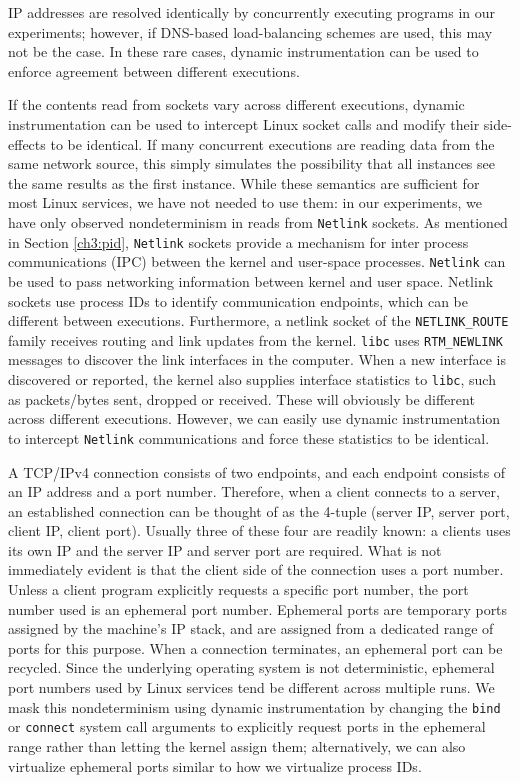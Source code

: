 IP addresses are resolved identically by concurrently executing programs 
in our experiments; however, if DNS-based
load-balancing schemes are used, this may not be the case.
In these rare cases, dynamic instrumentation can be used
to enforce agreement between different executions.

If the contents read from sockets
vary across different executions, dynamic instrumentation can be used to 
intercept Linux socket calls
and modify their side-effects to be identical. If
many concurrent executions are reading data from the
same network source, this simply simulates the possibility that all instances
see the same results as the first instance. 
While these semantics are sufficient for most Linux services,
we have not needed to use them: in our experiments,
we have only observed nondeterminism
in reads from \texttt{Netlink} sockets.
As mentioned in Section \ref{ch3:pid},
\texttt{Netlink} sockets provide a 
mechanism for inter process communications (IPC)
between the kernel and user-space processes.
\texttt{Netlink} can be used to pass
networking information between kernel
and user space. Netlink sockets
use process IDs to identify
communication endpoints, which can
be different between executions.
Furthermore, a netlink 
socket of the \texttt{NETLINK\_ROUTE}
family receives routing and link updates
from the kernel. \texttt{libc} uses \texttt{RTM\_NEWLINK}
messages to discover the link interfaces 
in the computer. When a new interface
is discovered or reported, the kernel also supplies
interface statistics to \texttt{libc},
such as packets/bytes sent, dropped or
received. These will obviously be different
across different executions. However,
we can easily use dynamic instrumentation
to intercept \texttt{Netlink} communications
and force these statistics to be
identical.

A TCP/IPv4 connection consists of two endpoints,
and each endpoint consists of an IP address and a port
number. Therefore, when a client connects to a server,
an established connection can be thought of as the
4-tuple (server IP, server port, client IP, client port).
Usually three of these four are readily known:
a clients uses its own IP and the
server IP and server port are required. What is not
immediately evident is that the client
side of the connection uses a port number.
Unless a client program explicitly
requests a specific port number,
the port number used is an ephemeral port number.
Ephemeral ports are temporary ports
assigned by the machine's IP stack, 
and are assigned from a dedicated range of
ports for this purpose. When a connection
terminates, an ephemeral port can be recycled.
Since the underlying operating system
is not deterministic, ephemeral
port numbers used by Linux services
tend be different across multiple 
runs. We mask this nondeterminism 
using dynamic instrumentation by
changing the \texttt{bind} or \texttt{connect} 
system call arguments to explicitly request ports
in the ephemeral range rather than letting the kernel 
assign them; alternatively,
we can also virtualize ephemeral ports
similar to how we virtualize process IDs.

